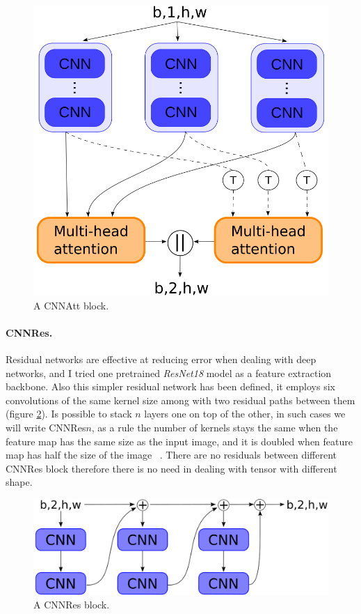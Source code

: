 \documentclass{article}
\begin{document}
\begin{figure}
    \centering
    \includegraphics[scale=.3]{images/cnn_att.png}
    \caption{A CNNAtt block.}
    \label{fig:cnnatt}
\end{figure}

\paragraph*{CNNRes.}
Residual networks are effective at reducing error when dealing with deep networks, and I tried one pretrained \textit{ResNet18} model as a feature extraction backbone.
Also this simpler residual network has been defined, it employs six convolutions of the same kernel size among with two residual paths between them (figure \ref{fig:cnnres}).
Is possible to stack $n$ layers one on top of the other, in such cases we will write CNNRes$n$, as a rule the number of kernels stays the same when the feature map has the same size as the input image, and it is doubled when feature map has half the size of the image ~\cite{he2016deep}.
There are no residuals between different CNNRes block therefore there is no need in dealing with tensor with different shape. 

\begin{figure}
    \centering
    \includegraphics[scale=.25]{images/cnn_res.png}
    \caption{A CNNRes block.}
    \label{fig:cnnres}
\end{figure}
\end{document}

